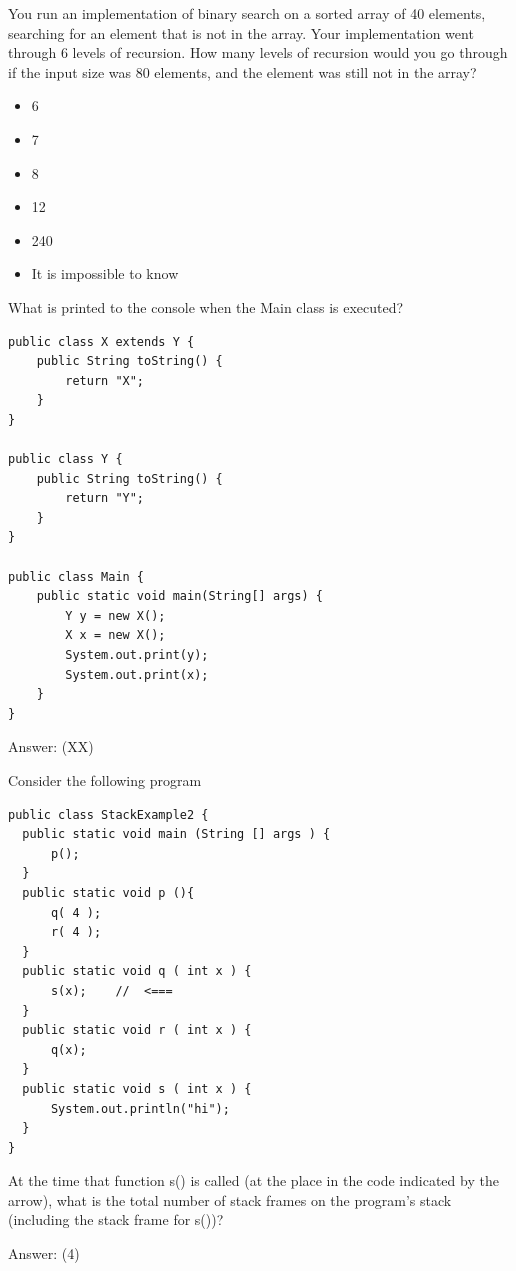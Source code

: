 \begin{question}
You run an implementation of binary search on a sorted array of 40 elements, searching for an element that is not in the array. Your implementation went through 6 levels of recursion.
How many levels of recursion would you go through if the input size was 80 elements, and the element was still not in the array?
\begin{itemize}[leftmargin=2em,itemsep=1pt,topsep=2pt]
\item[\cb{0}] 6
\item[\cb{1}] 7
\item[\cb{0}] 8
\item[\cb{0}] 12
\item[\cb{0}] 240
\item[\cb{0}] It is impossible to know
\end{itemize}
\end{question}

\begin{question}
What is printed to the console when the Main class is executed?

\begin{lstlisting}
public class X extends Y {
    public String toString() {
        return "X";
    }
}

public class Y {
    public String toString() {
        return "Y";
    }
}

public class Main {
    public static void main(String[] args) {
        Y y = new X();
        X x = new X();
        System.out.print(y);
        System.out.print(x);
    }
}
\end{lstlisting}

Answer: \underline{\hspace{1in}} \ifanswers (XX)\fi
\end{question}

\begin{question}
Consider the following program

\begin{lstlisting}
public class StackExample2 {
  public static void main (String [] args ) {
      p();
  }
  public static void p (){
      q( 4 );
      r( 4 );
  }
  public static void q ( int x ) {
      s(x);    //  <===
  }
  public static void r ( int x ) {
      q(x);
  }
  public static void s ( int x ) {
      System.out.println("hi");
  }
}
\end{lstlisting}

At the time that function s() is called (at the place in the code indicated by the arrow), what is the total number of stack frames on the program's stack (including the stack frame for s())?

Answer: \underline{\hspace{1in}} \ifanswers (4)\fi
\end{question}

